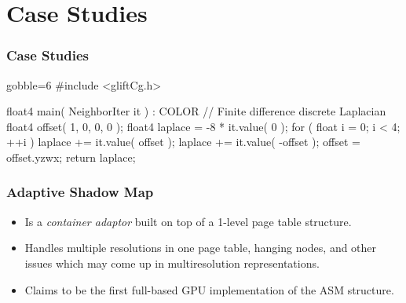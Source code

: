 \documentclass[xcolor={usenames,dvipsnames}]{beamer}
\begin{document}
\section{Case Studies}
\begin{frame}[fragile]
  \frametitle{Case Studies}

  \begin{overprint}
    \vspace{-5mm}
    \begin{ccode*}{gobble=6}
      #include <gliftCg.h>

      float4 main( NeighborIter it ) : COLOR
      {
        // Finite difference discrete Laplacian
        float4 offset( 1, 0, 0, 0 );
        float4 laplace = -8 * it.value( 0 );
        for ( float i = 0; i < 4; ++i ) {
          laplace += it.value( offset );
          laplace += it.value( -offset );
          offset = offset.yzwx;
        }
        return laplace;
      }
    \end{ccode*}
  \end{overprint}
\end{frame}

\begin{frame}
  \frametitle{Adaptive Shadow Map}

  \begin{itemize}
  \item<2-> Is a \emph{container adaptor} built on top of a 1-level page table
    structure.
  \item<3-> Handles multiple resolutions in one page table, hanging nodes, and
    other issues which may come up in multiresolution representations.
  \item<4-> Claims to be the first full-based GPU implementation of the ASM
    structure.
  \end{itemize}
\end{frame}
\end{document}
